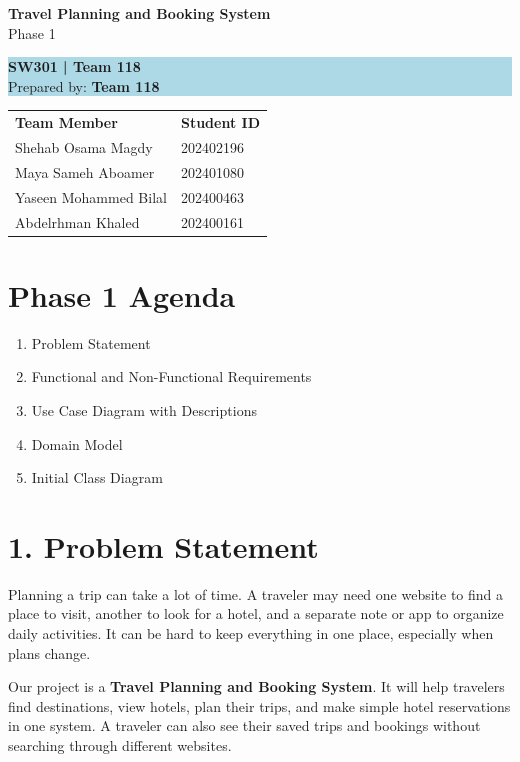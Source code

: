 \documentclass[11pt,a4paper]{article}
\begin{document}
\begin{center}
{\Huge\bfseries\color{navy} Travel Planning and Booking System}\\[7pt]
{\large Phase 1}\\[8pt]
\colorbox{lightblue}{\parbox{0.92\textwidth}{\centering\vspace{5pt}\textbf{SW301 | Team 118}\\Prepared by: \textbf{Team 118}\vspace{5pt}}}
\vspace{9pt}
{\small
\begin{tabular}{@{}ll@{}}
\textbf{Team Member} & \textbf{Student ID} \\
Shehab Osama Magdy & 202402196 \\
Maya Sameh Aboamer & 202401080 \\
Yaseen Mohammed Bilal & 202400463 \\
Abdelrhman Khaled & 202400161
\end{tabular}
}
\end{center}
\vspace{8pt}
\section*{Phase 1 Agenda}
\begin{enumerate}[leftmargin=1.8em,itemsep=2pt,topsep=3pt]
\item Problem Statement
\item Functional and Non-Functional Requirements
\item Use Case Diagram with Descriptions
\item Domain Model
\item Initial Class Diagram
\end{enumerate}
\vspace{5pt}
\section{1. Problem Statement}
Planning a trip can take a lot of time. A traveler may need one website to find a place to visit, another to look for a hotel, and a separate note or app to organize daily activities. It can be hard to keep everything in one place, especially when plans change.

Our project is a \textbf{Travel Planning and Booking System}. It will help travelers find destinations, view hotels, plan their trips, and make simple hotel reservations in one system. A traveler can also see their saved trips and bookings without searching through different websites.
\end{document}
